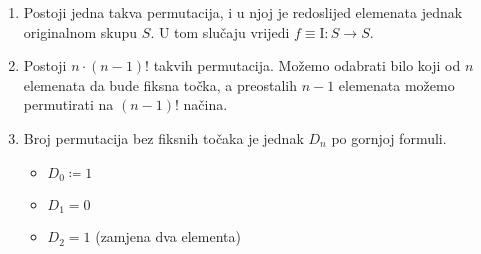 \begin{enumerate}
    \item Postoji jedna takva permutacija, i u njoj je redoslijed elemenata
    jednak originalnom skupu $S$. U tom slučaju vrijedi $f \equiv \mathrm{I} : S
    \to S$.
    \item Postoji $n \cdot (n - 1)!$ takvih permutacija. Možemo odabrati bilo
    koji od $n$ elemenata da bude fiksna točka, a preostalih $n-1$ elemenata
    možemo permutirati na $(n-1)!$ načina.
    \item Broj permutacija bez fiksnih točaka je jednak $D_n$ po gornjoj formuli.
    \begin{itemize}
        \item $D_0 \coloneq 1$
        \item $D_1 = 0$
        \item $D_2 = 1$ (zamjena dva elementa)
    \end{itemize}
\end{enumerate}
